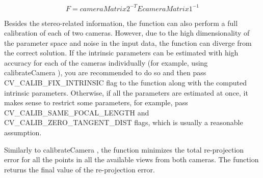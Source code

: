 \[F = cameraMatrix2^{-T} E cameraMatrix1^{-1}\] 

Besides the stereo-\/related information, the function can also perform a full calibration of each of two cameras. However, due to the high dimensionality of the parameter space and noise in the input data, the function can diverge from the correct solution. If the intrinsic parameters can be estimated with high accuracy for each of the cameras individually (for example, using calibrate\+Camera ), you are recommended to do so and then pass C\+V\+\_\+\+C\+A\+L\+I\+B\+\_\+\+F\+I\+X\+\_\+\+I\+N\+T\+R\+I\+N\+S\+IC flag to the function along with the computed intrinsic parameters. Otherwise, if all the parameters are estimated at once, it makes sense to restrict some parameters, for example, pass C\+V\+\_\+\+C\+A\+L\+I\+B\+\_\+\+S\+A\+M\+E\+\_\+\+F\+O\+C\+A\+L\+\_\+\+L\+E\+N\+G\+TH and C\+V\+\_\+\+C\+A\+L\+I\+B\+\_\+\+Z\+E\+R\+O\+\_\+\+T\+A\+N\+G\+E\+N\+T\+\_\+\+D\+I\+ST flags, which is usually a reasonable assumption. 

Similarly to calibrate\+Camera , the function minimizes the total re-\/projection error for all the points in all the available views from both cameras. The function returns the final value of the re-\/projection error. \mbox{\label{group__calib3d_ga10101a04b035018f2589ecc315d38ce5}} 
